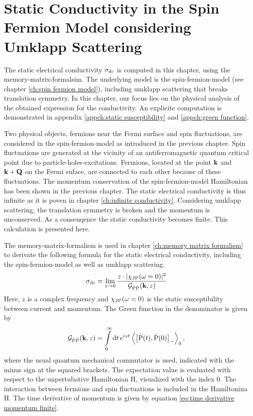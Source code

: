%
%
%
\chapter{Static Conductivity in the Spin Fermion Model considering Umklapp Scattering}
\label{ch:calculation}
%
%
%
The static electrical conductivity $\sigma_{\mathrm{dc}}$ is computed in this chapter, using the memory-matrix-formalsim.
The underlying model is the spin-fermion-model (see chapter \ref{ch:spin fermion model}), including umklapp scattering that breaks translation symmetry.
In this chapter, our focus lies on the physical analysis of the obtained expression for the conductivity.
An explicite computation is demonstrated in appendix \ref{appch:static susceptibility} and \ref{appch:green function}.

%
%
%
%
Two physical objects, fermions near the Fermi surface and spin fluctuations, are considered in the spin-fermion-model as introduced in the previous chapter.
Spin fluctuations are generated at the vicinity of an antiferromagnetic quantum critical point due to particle-holes-excitations.
Fermions, located at the point $\vb{k}$ and $\vb{k}+\vb{Q}$ on the Fermi suface, are connected to each other because of these fluctuations.
The momentum conservation of the spin-fermion-model Hamiltonian has been shown in the previous chapter.
The static electrical conductivity is thus infinite as it is poven in chapter \ref{ch:infinite conductivity}.
Considering umklapp scattering, the translation symmetry is broken and the momentum is unconserved.
As a conseuqence the static conductivity becomes finite.
This calculation is presented here.

The memory-matrix-formalism is used in chapter \ref{ch:memory matrix formalism} to derivate the following formula for the static electrical conductivity, including the spin-fermion-model as well as umklapp scattering.
%
\begin{align}
	\sigma_{\mathrm{dc}} = \lim\limits_{z \to 0} \frac{z \cdot |\chi_{\mathrm{JP}}(\omega = 0)|^{2}}{\mathcal{G}_{\dot{\mathrm{P}}\dot{\mathrm{P}}}(\vb{k}, z)}
	\label{eq:static conductivity formula}
\end{align}
%
Here, $z$ is a complex frequency and $\chi_{\mathrm{JP}}(\omega = 0)$ is the static susceptibility between current and momentum.
The Green function in the denominator is given by
%
\begin{align}
	\mathcal{G}_{\dot{\mt{P}}\dot{\mt{P}}}(\vb{k}, z) = \int\limits_{0}^{\infty} \dd{t} e^{izt} \expval{\comm{\dot{\mt{P}}(t)}{\dot{\mt{P}}(0)}_{-}}_{0},
	\label{eq:Green function}
\end{align}
%
where the usual quantum mechanical commutator is used, indicated with the minus sign at the squared brackets.
The expectation value is evaluated with respect to the unpertubative Hamiltonian H, visualized with the index 0.
The interaction between fermions and spin fluctuations is included in the Hamiltonina H.
The time derivative of momentum is given by equation \eqref{eq:time derivative momentum finite}.

